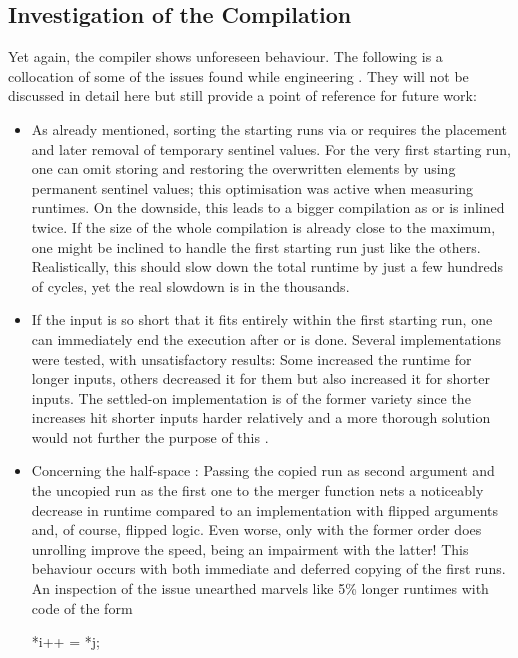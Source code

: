 \subsection*{Investigation of the Compilation}
\label{sec:tasklet:merge:compilation}

Yet again, the compiler shows unforeseen behaviour.
The following is a collocation of some of the issues found while engineering \MS{}.
They will not be discussed in detail here but still provide a point of reference for future work:
\begin{itemize}
	\item
	As already mentioned, sorting the starting runs via \IS{} or \ShS{} requires the placement and later removal of temporary sentinel values.
	For the very first starting run, one can omit storing and restoring the overwritten elements by using permanent sentinel values;
	this optimisation was active when measuring runtimes.
	On the downside, this leads to a bigger compilation as \IS{} or \ShS{} is inlined twice.
	If the size of the whole compilation is already close to the maximum, one might be inclined to handle the first starting run just like the others.
	Realistically, this should slow down the total runtime by just a few hundreds of cycles, yet the real slowdown is in the thousands.

	\item
	If the input is so short that it fits entirely within the first starting run, one can immediately end the execution after \IS{} or \ShS{} is done.
	Several implementations were tested, with unsatisfactory results:
	Some increased the runtime for longer inputs, others decreased it for them but also increased it for shorter inputs.
	The settled-on implementation is of the former variety since the increases hit shorter inputs harder relatively and a more thorough solution would not further the purpose of this .

	\item
	Concerning the half-space \MS{}:
	Passing the copied run as second argument and the uncopied run as the first one to the merger function nets a noticeably decrease in runtime compared to an implementation with flipped arguments and, of course, flipped logic.
	Even worse, only with the former order does unrolling improve the speed, being an impairment with the latter!
	This behaviour occurs with both immediate and deferred copying of the first runs.
	An inspection of the issue unearthed marvels like 5\% longer runtimes with code of the form
	{  %
		\par
		\centering
		\begin{minipage}{10cm}
			\centering
			\begin{minipage}{ \widthof{\ttfamily a = b - i;} }
				\ttfamily
				*i++ = *j;


\end{minipage}
\end{minipage}}
\end{itemize}

